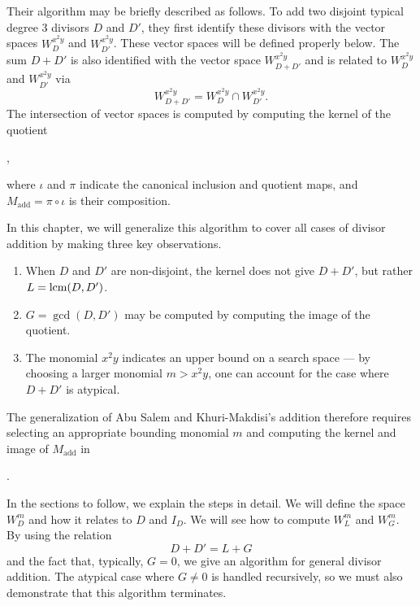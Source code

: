 Their algorithm may be briefly described as follows.
To add two disjoint typical degree 3 divisors $D$ and $D'$,
they first identify these divisors with the vector spaces $W_D^{x^2y}$ and $W_{D'}^{x^2y}$.
These vector spaces will be defined properly below.
The sum $D + D'$ is also identified with the vector space $W_{D + D'}^{x^2y}$
and is related to $W_D^{x^2y}$ and $W_{D'}^{x^2y}$ via
\[ W_{D + D'}^{x^2y} = W_D^{x^2y} \cap W_{D'}^{x^2y}. \]
The intersection of vector spaces is computed by computing the kernel of the quotient
\begin{center}
,
\end{center}
where $\iota$ and $\pi$ indicate the canonical inclusion and quotient maps,
and $M_{\text{add}} = \pi \circ \iota$ is their composition.

In this chapter, we will generalize this algorithm to cover all cases of divisor addition
by making three key observations.
\begin{enumerate}[label=(\roman*)]
  \item When $D$ and $D'$ are non-disjoint, the kernel does not give $D + D'$, but rather $L = \operatorname{lcm}(D, D')$.
  \item $G = \gcd(D, D')$ may be computed by computing the image of the quotient.
  \item The monomial $x^2y$ indicates an upper bound on a search space ---
        by choosing a larger monomial $m > x^2y$, one can account for the case where
        $D + D'$ is atypical.
\end{enumerate}
The generalization of Abu Salem and Khuri-Makdisi's addition therefore requires
selecting an appropriate bounding monomial $m$ and computing the kernel and image of $M_{\text{add}}$ in
\begin{center}
.
\end{center}
In the sections to follow, we explain the steps in detail.
We will define the space $W_D^m$ and how it relates to $D$ and $I_D$.
We will see how to compute $W_L^m$ and $W_G^m$.
By using the relation
\begin{equation}
  \label{eq_lcm_plus_gcd}
  D + D' = L + G
\end{equation}
and the fact that, typically, $G = 0$,
we give an algorithm for general divisor addition.
The atypical case where $G \neq 0$ is handled recursively,
so we must also demonstrate that this algorithm terminates.



